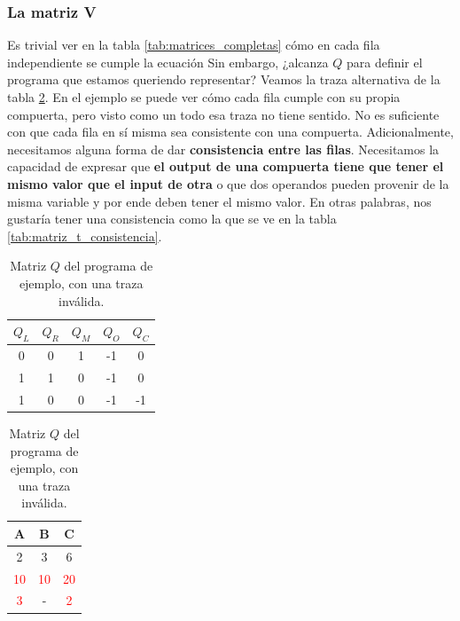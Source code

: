\subsubsection{\textbf{La matriz V}}

Es trivial ver en la tabla \ref{tab:matrices_completas} cómo en cada fila independiente se cumple la ecuación \PlonkFormula Sin embargo, ¿alcanza $Q$ para definir el programa que estamos queriendo representar? Veamos la traza alternativa de la tabla \ref{tab:matrices_completas_invalida}. En el ejemplo se puede ver cómo cada fila cumple con su propia compuerta, pero visto como un todo esa traza no tiene sentido. No es suficiente con que cada fila en sí misma sea consistente con una compuerta. Adicionalmente, necesitamos alguna forma de dar \textbf{consistencia entre las filas}. Necesitamos la capacidad de expresar que \textbf{el output de una compuerta tiene que tener el mismo valor que el input de otra} o que dos operandos pueden provenir de la misma variable y por ende deben tener el mismo valor. En otras palabras, nos gustaría tener una consistencia como la que se ve en la tabla \ref{tab:matriz_t_consistencia}.

\begin{table}
\centering
\begin{minipage}{0.45\textwidth}
\centering
\begin{tabular}{ccccc}
\toprule
\textbf{$Q_L$} & \textbf{$Q_R$} & \textbf{$Q_M$} & \textbf{$Q_O$} & \textbf{$Q_C$} \\
\midrule
0 & 0 & 1 & -1 & 0 \\
1 & 1 & 0 & -1 & 0 \\
1 & 0 & 0 & -1 & -1 \\
\bottomrule
\end{tabular}
\end{minipage}
\begin{minipage}{0.45\textwidth}
\centering
\begin{tabular}{ccc}
\toprule
A & B & C \\
\midrule
2 & 3 & 6 \\
\textcolor{red}{10} & \textcolor{red}{10} & \textcolor{red}{20} \\
\textcolor{red}{3} & - & \textcolor{red}{2} \\
\bottomrule
\end{tabular}
\end{minipage}

\caption{Matriz $Q$ del programa de ejemplo, con una traza inválida.}
\label{tab:matrices_completas_invalida}
\end{table}




